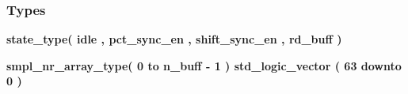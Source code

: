 \subsubsection*{Types}
 \begin{DoxyCompactItemize}
\item 
{\bfseries {\bf state\+\_\+type}{\bfseries \textcolor{vhdlchar}{(}\textcolor{vhdlchar}{ }\textcolor{vhdlchar}{idle}\textcolor{vhdlchar}{ }\textcolor{vhdlchar}{,}\textcolor{vhdlchar}{ }\textcolor{vhdlchar}{pct\+\_\+sync\+\_\+en}\textcolor{vhdlchar}{ }\textcolor{vhdlchar}{,}\textcolor{vhdlchar}{ }\textcolor{vhdlchar}{shift\+\_\+sync\+\_\+en}\textcolor{vhdlchar}{ }\textcolor{vhdlchar}{,}\textcolor{vhdlchar}{ }\textcolor{vhdlchar}{rd\+\_\+buff}\textcolor{vhdlchar}{ }\textcolor{vhdlchar}{)}\textcolor{vhdlchar}{ }}} 
\item 
{\bfseries {\bf smpl\+\_\+nr\+\_\+array\+\_\+type}{\bfseries \textcolor{vhdlchar}{(}\textcolor{vhdlchar}{ }\textcolor{vhdlchar}{ } \textcolor{vhdldigit}{0} \textcolor{vhdlchar}{ }\textcolor{keywordflow}{to}\textcolor{vhdlchar}{ }\textcolor{vhdlchar}{ }\textcolor{vhdlchar}{ }\textcolor{vhdlchar}{ }{\bfseries {\bf n\+\_\+buff}} \textcolor{vhdlchar}{-\/}\textcolor{vhdlchar}{ } \textcolor{vhdldigit}{1} \textcolor{vhdlchar}{ }\textcolor{vhdlchar}{)}\textcolor{vhdlchar}{ }\textcolor{vhdlchar}{ }\textcolor{comment}{std\+\_\+logic\+\_\+vector}\textcolor{vhdlchar}{ }\textcolor{vhdlchar}{(}\textcolor{vhdlchar}{ }\textcolor{vhdlchar}{ } \textcolor{vhdldigit}{63} \textcolor{vhdlchar}{ }\textcolor{keywordflow}{downto}\textcolor{vhdlchar}{ }\textcolor{vhdlchar}{ } \textcolor{vhdldigit}{0} \textcolor{vhdlchar}{ }\textcolor{vhdlchar}{)}\textcolor{vhdlchar}{ }}} 
\end{DoxyCompactItemize}
